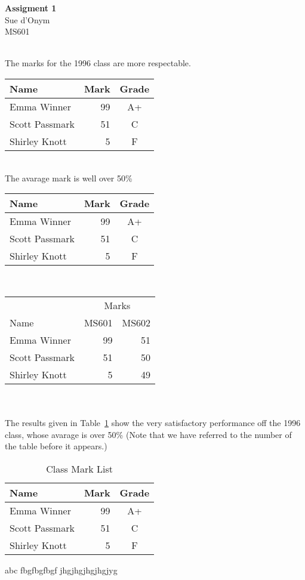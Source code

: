 \documentclass{article}
\begin{document}
\begin{center}
	{\large\textbf{Assigment 1}}\\
	Sue d'Onym\\
	MS601
\end{center}	
\ \\

The marks for the 1996 class are more respectable. \ \\
\begin{tabular}{lrc}
	Name & Mark & Grade \\
	\hline
	Emma Winner & 99 & A+ \\
	Scott Passmark & 51 & C \\
	Shirley Knott & 5 & F 
\end{tabular} 
\ \\	
The avarage mark is well over 50\%
\ \\

\begin{center}
	\begin{tabular}{|l||r|c|}
		\hline
		Name & Mark & Grade \\
		\hline \hline
		Emma Winner & 99 & A+ \\
		Scott Passmark & 51 & C \\
		Shirley Knott & 5 & F \\
		\hline
	\end{tabular}
\end{center}
\ \\

\begin{tabular}{|l||r|r|}
	\hline
	& \multicolumn{2}{c|}{Marks}\\
		\cline{2-3}
	Name & MS601 & MS602 \\
	\hline \hline
		Emma Winner & 99 & 51 \\
		Scott Passmark & 51 & 50 \\
		Shirley Knott & 5 & 49 \\
		\hline	
\end{tabular}	
\ \\ \ \\




The results given in Table~\ref{tab:a} show the very satisfactory performance off the 1996 class, whose avarage is over 50\% (Note that we have referred to the number of the table before it appears.)
\begin{table}
	\begin{center}
		\begin{tabular}{lrc}\hline
			Name & Mark & Grade \\
			\hline
			Emma Winner & 99 & A+ \\
			Scott Passmark & 51 & C \\
			Shirley Knott & 5 & F \\
	\end{tabular}	
	\caption{Class Mark List}\label{tab:a}
	\end{center}
\end{table}

abc fbgfbgfbgf \cite{Stigler-2005} jhgjhgjhgjhgjyg


	\nocite{*}
	
		
\end{document}
